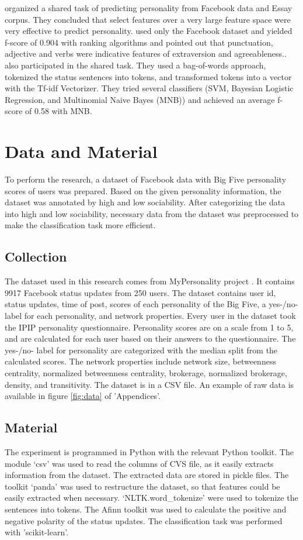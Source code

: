 \documentclass[
10pt, %
a4paper, %
oneside, %
headinclude,footinclude, %
] {book}%
\begin{document}
\citet{celli2013workshop} organized a shared task of predicting personality from Facebook data and Essay corpus. They concluded that select features over a very large feature space were very effective to predict personality. \citet{markovikj2013mining} used only the Facebook dataset and yielded f-score of 0.904 with ranking algorithms and pointed out that punctuation, adjective and verbs were indicative features of extraversion and agreeableness.. \citet{alam2013personality} also participated in the shared task. They used a bag-of-words approach, tokenized the status sentences into tokens, and transformed tokens into a vector with the Tf-idf Vectorizer. They tried several classifiers (SVM, Bayesian Logistic Regression, and Multinomial Naive Bayes (MNB)) and achieved an average f-score of 0.58 with MNB.

\chapter{Data and Material}
To perform the research, a dataset of Facebook data with Big Five personality scores of users was prepared. Based on the given personality information, the dataset was annotated by high and low sociability. After categorizing the data into high and low sociability, necessary data from the dataset was preprocessed to make the classification task more efficient.

\section{Collection} 

The dataset used in this research comes from MyPersonality project \citet{celli2013workshop}. It contains 9917 Facebook status updates from 250 users. The dataset contains user id, status updates, time of post, scores of each personality of the Big Five, a yes-/no- label for each personality, and network properties. Every user in the dataset took the IPIP personality questionnaire. Personality scores are on a scale from 1 to 5, and are calculated for each user based on their answers to the questionnaire. The yes-/no- label for personality are categorized with the median split from the calculated scores. The network properties include network size, betweenness centrality, normalized betweenness centrality, brokerage, normalized brokerage, density, and transitivity. The dataset is in a CSV file. An example of raw data is available in figure \ref{fig:data} of 'Appendices'.

\section{Material}
The experiment is programmed in Python with the relevant Python toolkit. The module ‘csv’ was used to read the columns of CVS file, as it easily extracts information from the dataset. The extracted data are stored in pickle files. The toolkit ‘panda’ was used to restructure the dataset, so that features could be easily extracted when necessary. ‘NLTK.word\_tokenize’ were used to tokenize the sentences into tokens. The Afinn toolkit was used to calculate the positive and negative polarity of the status updates. The classification task was performed with 'scikit-learn'.
\end{document}
